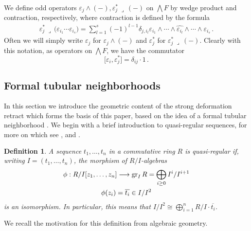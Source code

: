 \documentclass[english,letter paper,12pt,leqno]{article}
\theoremstyle{example}
\newtheorem{definition}[theorem]{Definition}
\numberwithin{equation}{section}
\def\be{\begin{equation}}
\def\ee{\end{equation}}
\begin{document}
We define odd operators $\varepsilon_j \wedge (-), \varepsilon_j^* \,\lrcorner\, (-)$ on $\bigwedge F$ by wedge product and contraction, respectively, where contraction is defined by the formula
\begin{align*}
\varepsilon_j^* \,\lrcorner\, \Big( \varepsilon_{i_1} \cdots \varepsilon_{i_s} \Big) = \sum_{l=1}^s (-1)^{l-1} \delta_{j, i_l} \varepsilon_{i_1} \wedge \cdots \wedge \widehat{ \varepsilon_{i_l} } \wedge \cdots \wedge \varepsilon_{i_s}\,.
\end{align*}
Often we will simply write $\varepsilon_j$ for $\varepsilon_j \wedge (-)$ and $\varepsilon_j^*$ for $\varepsilon_j^* \,\lrcorner\, (-)$. Clearly with this notation, as operators on $\bigwedge F$, we have the commutator
\be\label{eq:wedge_contract_comm}
\big[ \varepsilon_i, \varepsilon_j^* \big] = \delta_{ij} \cdot 1\,.
\ee

\subsection{Formal tubular neighborhoods}

In this section we introduce the geometric content of the strong deformation retract which forms the basis of this paper, based on the idea of a formal tubular neighborhood \cite{cuntzquillen, lipman}. We begin with a brief introduction to quasi-regular sequences, for more on which see \cite{matsumura}, \cite[Chapitre $0$ \S 15.1]{EGA4} and \cite[Section\,10.68]{stacks_project}.

\begin{definition} A sequence $t_1,\ldots,t_n$ in a commutative ring $R$ is \emph{quasi-regular} if, writing $I = (t_1,\ldots,t_n)$, the morphism of $R/I$-algebras
\begin{gather*}
\phi: R/I[z_1,\ldots,z_n] \longrightarrow \operatorname{gr}_I R = \bigoplus_{i \ge 0} I^i / I^{i+1}\\
\phi(z_i) = \overline{t_i} \in I/I^2
\end{gather*}
is an isomorphism. In particular, this means that $I/I^2 \cong \bigoplus_{i=1}^n R/I \cdot \overline{t_i}$.
\end{definition}

We recall the motivation for this definition from algebraic geometry.
\end{document}
